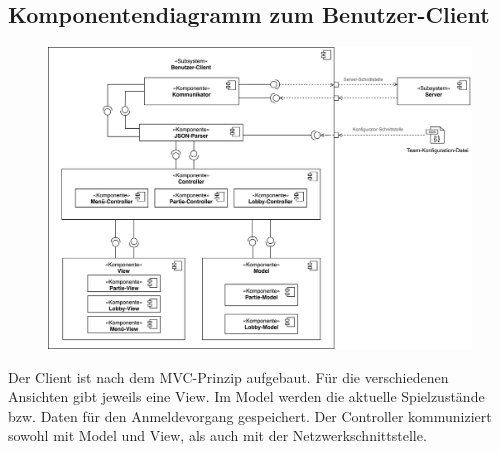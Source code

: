 \subsection{Komponentendiagramm zum Benutzer-Client}
\begin{figure}[H]
    \centering
    \includegraphics[scale=0.13]{../Meilenstein05/images/komponentendiagramm_benutzer-client.png}
\end{figure}
Der Client ist nach dem MVC-Prinzip aufgebaut. Für die verschiedenen Ansichten gibt jeweils eine View. Im Model werden die aktuelle Spielzustände bzw. Daten für den Anmeldevorgang gespeichert. Der Controller kommuniziert sowohl mit Model und View, als auch mit der Netzwerkschnittstelle.


